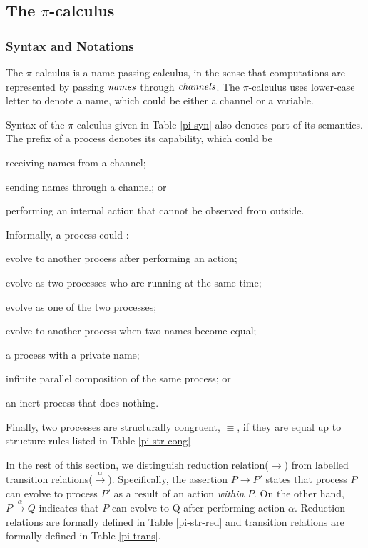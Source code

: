\subsection{The $\pi$-calculus}
\label{sec:PA}

\subsubsection{Syntax and Notations}

The $\pi$-calculus \cite{pi_paper, pi_book} is a name passing calculus, in the sense that computations are represented by passing $\it{names}$ through $\it{channels}$.  The $\pi$-calculus uses lower-case letter to denote a name, which could be either a channel or a variable.  

Syntax of the $\pi$-calculus given in Table \ref{pi-syn} also denotes part of its semantics.  The prefix of a process denotes its capability, which could be  
\begin{inparaenum}[(i)]
  \item receiving names from a channel;
  \item sending names through a channel; or
  \item performing an internal action that cannot be observed from outside.
\end{inparaenum}
Informally, a process could :
\begin{inparaenum}[(1)]
  \item evolve to another process after performing an action;
  \item evolve as two processes who are running at the same time;
  \item evolve as one of the two processes;
  \item evolve to another process when two names become equal;
  \item a process with a private name;
  \item infinite parallel composition of the same process; or
  \item an inert process that does nothing.
\end{inparaenum}
Finally, two processes are structurally congruent, $\equiv$, if they are equal up to structure rules listed in Table \ref{pi-str-cong}

In the rest of this section, we distinguish reduction relation($\longrightarrow$) from labelled transition relations($\overset{\alpha}{\longrightarrow}$).  Specifically, the assertion $P \longrightarrow P'$ states that process $P$ can evolve to process $P'$ as a result of an action {\it{within}} $P$.  On the other hand, $P \overset{\alpha}{\longrightarrow} Q$ indicates that $P$ can evolve to Q after performing action $\alpha$.  Reduction relations are formally defined in Table \ref{pi-str-red} and transition relations are formally defined in Table \ref{pi-trans}.

